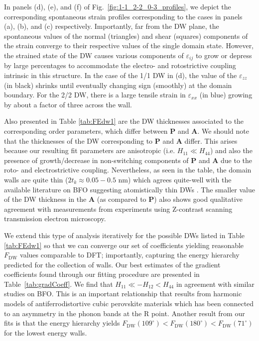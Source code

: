 \documentclass[%
 reprint,
superscriptaddress,
 amsmath,amssymb,
prb,
]{revtex4-1}
\begin{document}
%
In panels (d), (e), and (f) of Fig.~\ref{fig:1-1_2-2_0-3_profiles}, we depict the corresponding spontaneous strain profiles corresponding to the cases in panels (a), (b), and (c) respectively.
%
Importantly, far from the DW plane, the spontaneous values of the normal (triangles) and shear (squares) components of the strain converge to their respective values of the single domain state.
%
However, the strained state of the DW causes various components of $\varepsilon_{ij}$ to grow or depress by large percentages to accommodate the electro- and rotostrictive coupling intrinsic in this structure.
%
In the case of the 1/1 DW in (d), the value of the $\varepsilon_{zz}$ (in black) shrinks until eventually changing sign (smoothly) at the domain boundary.
%
For the 2/2 DW, there is a large tensile strain in $\varepsilon_{xx}$ (in blue) growing by about a factor of three across the wall.
%

%
Also presented in Table \ref{tab:FEdw1} are the DW thicknesses associated to the corresponding order parameters, which differ between $\mathbf{P}$ and $\mathbf{A}$.
%
We should note that the thicknesses of the DW corresponding to $\mathbf{P}$ and $\mathbf{A}$ differ.
%
This arises because our resulting fit parameters are anisotropic (i.e. $H_{11} \ll H_{44}$) and also the presence of growth/decrease in non-switching components of $\mathbf{P}$ and $\mathbf{A}$ due to the roto- and electrostrictive coupling.
%
Nevertheless, as seen in the table, the domain walls are quite thin ($2 t_k \approx 0.05 - 0.5$ nm) which agrees quite-well with the available literature on BFO suggesting atomistically thin DWs \cite{Dieguez2013, Hlinka2017, Korbel2020, Borisevich2010}.
%
The smaller value of the DW thickness in the $\mathbf{A}$ (as compared to $\mathbf{P}$) also shows good qualitative agreement with measurements from experiments using Z-contrast scanning transmission electron microscopy\cite{Borisevich2010}.




%
We extend this type of analysis iteratively for the possible DWs listed in Table \ref{tab:FEdw1} so that we can converge our set of coefficients yielding reasonable $F_\mathrm{DW}$ values comparable to DFT; importantly, capturing the energy hierarchy\cite{Dieguez2013, Korbel2020, Xue2014} predicted for the collection of walls.
%
Our best estimates of the gradient coefficients found through our fitting procedure are presented in Table~\ref{tab:gradCoeff}.
%
We find that $H_{11} \ll -H_{12} < H_{44}$ in agreement with similar studies on BFO\cite{Xue2014, Xue2021}. 
%
This is an important relationship that results from harmonic models of antiferrodistortive cubic perovskite materials which has been connected to an asymmetry in the phonon bands at the R point\cite{Gesi1972, Stirling1972, Cao1990}.
%
Another result from our fits is that the energy hierarchy yields $F_\mathrm{DW}(109^\circ) < F_\mathrm{DW}(180^\circ) < F_\mathrm{DW}(71^\circ)$  for the lowest energy walls\cite{Lubk2009, Dieguez2013, Xue2014, Xue2021}.
%
\end{document}
